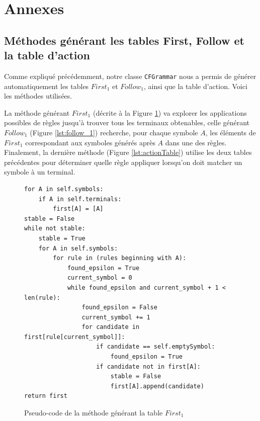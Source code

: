 \documentclass[a4paper,10pt]{article}
\begin{document}



\pagebreak

\section{Annexes}

\subsection{Méthodes générant les tables First, Follow et la table d'action}

\label{anx:FirstFollowAT}

Comme expliqué précédemment, notre classe \verb?CFGrammar? nous a permis de générer automatiquement les tables $First_1$ et $Follow_1$, ainsi que la table d'action. Voici les méthodes utilisées.

La méthode générant $First_1$ (décrite à la Figure \ref{lst:first_1}) va explorer les applications possibles de règles jusqu'à trouver tous les terminaux obtenables, celle générant $Follow_1$ (Figure \ref{lst:follow_1}) recherche, pour chaque symbole $A$, les éléments de $First_1$ correspondant aux symboles générés après $A$ dans une des règles. Finalement, la dernière méthode (Figure \ref{lst:actionTable}) utilise les deux tables précédentes pour déterminer quelle règle appliquer lorsqu'on doit matcher un symbole à un terminal.

\begin{figure}[H]
\begin{lstlisting}
for A in self.symbols:
	if A in self.terminals:
		first[A] = [A]
stable = False
while not stable:
	stable = True
	for A in self.symbols:
		for rule in (rules beginning with A):
			found_epsilon = True
			current_symbol = 0
			while found_epsilon and current_symbol + 1 < len(rule):
				found_epsilon = False
				current_symbol += 1
				for candidate in first[rule[current_symbol]]:
					if candidate == self.emptySymbol:
						found_epsilon = True
					if candidate not in first[A]:
						stable = False
						first[A].append(candidate)
return first
\end{lstlisting}
\fontfamily{}
\caption{Pseudo-code de la méthode générant la table $First_1$}
\label{lst:first_1}
\end{figure}
\end{document}
